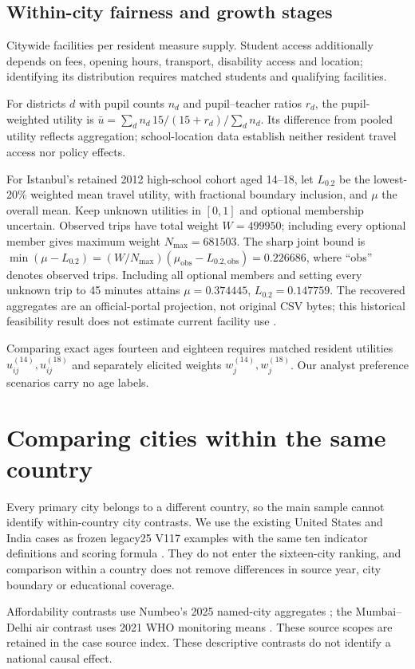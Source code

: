 \subsection{Within-city fairness and growth stages}
Citywide facilities per resident measure supply. Student access additionally
depends on fees, opening hours, transport, disability access and location;
identifying its distribution requires matched students and qualifying facilities.

\EquityCase
For districts $d$ with pupil counts $n_d$ and pupil--teacher ratios $r_d$,
the pupil-weighted utility is
$\bar u=\sum_d n_d\,15/(15+r_d)/\sum_dn_d$.
Its difference from pooled utility reflects aggregation; school-location data
establish neither resident travel access nor policy effects.

For Istanbul's retained 2012 high-school cohort aged 14--18, let $L_{0.2}$
be the lowest-20\% weighted mean travel utility, with fractional boundary
inclusion, and $\mu$ the overall mean. Keep unknown utilities in $[0,1]$ and
optional membership uncertain. Observed trips have total weight $W=499950$;
including every optional member gives maximum weight $N_{\max}=681503$.
The sharp joint bound is
$\min(\mu-L_{0.2})=(W/N_{\max})(\mu_{\mathrm{obs}}-L_{0.2,\mathrm{obs}})=0.226686$,
where ``obs'' denotes observed trips. Including all optional members and setting
every unknown trip to 45 minutes attains $\mu=0.374445$, $L_{0.2}=0.147759$.
The recovered aggregates are an official-portal projection, not original CSV
bytes; this historical feasibility result does not estimate current facility
use \cite{istanbul}.

\AgeCase



Comparing exact ages fourteen and eighteen requires matched resident utilities
$u_{ij}^{(14)},u_{ij}^{(18)}$ and separately elicited weights
$w_j^{(14)},w_j^{(18)}$. Our analyst preference scenarios carry no age labels.

\section{Comparing cities within the same country}
Every primary city belongs to a different country, so the main sample cannot
identify within-country city contrasts. We use the existing United States and
India cases as frozen legacy25 V117 examples with the same ten indicator
definitions and scoring formula \cite{legacycase}. They do not enter the sixteen-city ranking,
and comparison within a country does not remove differences in source year,
city boundary or educational coverage.



\CountryInterpretation
Affordability contrasts use Numbeo's 2025 named-city aggregates
\cite{numbeocase}; the Mumbai--Delhi air contrast uses 2021 WHO monitoring
means \cite{whocase}. These source scopes are retained in the case source index.
These descriptive contrasts do not identify a national causal effect.
